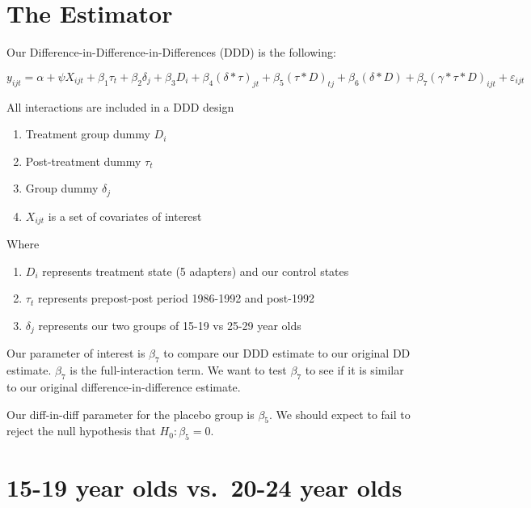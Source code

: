 \documentclass[
]{book}
\providecommand{\tightlist}{%
  \setlength{\itemsep}{0pt}\setlength{\parskip}{0pt}}
\begin{document}
\section{The Estimator}\label{the-estimator}

Our Difference-in-Difference-in-Differences (DDD) is the following:

\[ y_{ijt} = \alpha + \psi X_{ijt} + \beta_{1} \tau_{t} + \beta_{2} \delta _{j} + \beta_{3} D_{i} + \beta_{4} (\delta * \tau)_{jt} + \beta_{5} (\tau * D)_{tj} + \beta_{6} (\delta*D) + \beta_{7} (\gamma*\tau*D)_{ijt} + \varepsilon_{ijt} \]

All interactions are included in a DDD design

\begin{enumerate}
\def\labelenumi{\arabic{enumi}.}
\tightlist
\item
  Treatment group dummy \(D_i\)
\item
  Post-treatment dummy \(\tau_{t}\)
\item
  Group dummy \(\delta_{j}\)
\item
  \(X_{ijt}\) is a set of covariates of interest
\end{enumerate}

Where

\begin{enumerate}
\def\labelenumi{\arabic{enumi}.}
\tightlist
\item
  \(D_{i}\) represents treatment state (5 adapters) and our control states
\item
  \(\tau_{t}\) represents prepost-post period 1986-1992 and post-1992
\item
  \(\delta_{j}\) represents our two groups of 15-19 vs 25-29 year olds
\end{enumerate}

Our parameter of interest is \(\beta_{7}\) to compare our DDD estimate to our original DD estimate. \(\beta_{7}\) is the full-interaction term. We want to test \(\beta_{7}\) to see if it is similar to our original difference-in-difference estimate.

Our diff-in-diff parameter for the placebo group is \(\beta_{5}\). We should expect to fail to reject the null hypothesis that \(H_{0}: \beta_{5}=0\).

\section{15-19 year olds vs.~20-24 year olds}\label{year-olds-vs.-20-24-year-olds}
\end{document}
